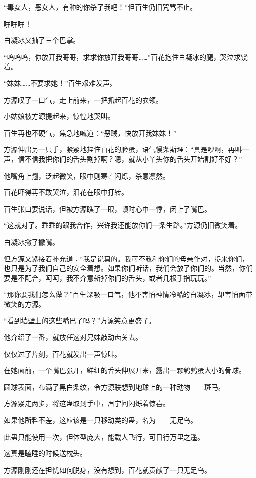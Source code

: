 \begin{this_body}
“毒女人，恶女人，有种的你杀了我吧！”但百生仍旧咒骂不止。

啪啪啪！

白凝冰又抽了三个巴掌。

“呜呜呜，你放开我哥哥，求求你放开我哥哥……”百花抱住白凝冰的腿，哭泣求饶着。

“妹妹……不要求她！”百生艰难发声。

方源叹了一口气，走上前来，一把抓起百花的衣领。

小姑娘被方源提起来，惊惶地哭叫。

百生再也不硬气，焦急地喊道：“恶贼，快放开我妹妹！”

方源伸出另一只手，紧紧地捏住百花的脸蛋，语气慢条斯理：“真是吵啊，再叫一声，信不信我把你们的舌头割掉啊？嗯，就从小丫头你的舌头开始割好不好？”

他嘴角上翘，泛起微笑，眼中则寒芒闪烁，杀意凛然。

百花吓得再不敢哭泣，泪花在眼中打转。

百生张口要说话，但被方源瞧了一眼，顿时心中一悸，闭上了嘴巴。

“这就对了。乖乖的跟我合作，兴许我还能放你们一条生路。”方源仍旧微笑着。

白凝冰撇了撇嘴。

但方源又紧接着补充道：“我是说真的。我可不敢和你们的母亲作对，捉来你们，也只是为了我们自己的安全着想。如果你们听话，我们会放了你们的。当然，你们要是不配合，呵呵，我不介意斩掉你们的舌头，或者几根手指玩玩。”

“那你要我们怎么做？”百生深吸一口气，他不害怕神情冷酷的白凝冰，却害怕面带微笑的方源。

“看到墙壁上的这些嘴巴了吗？”方源笑意更盛了。

他介绍了一番，就放任这对兄妹敲动齿关去。

仅仅过了片刻，百花就发出一声惊叫。

在她面前，一个嘴巴张开，鲜红的舌头伸展开来，露出一颗鹌鹑蛋大小的骨球。

圆球表面，布满了黑白条纹，令方源联想到地球上的一种动物——斑马。

方源紧走两步，将这蛊取到手中，眉宇间闪烁着惊喜。

如果他所料不差，这应该是一只移动类的蛊，名为——无足鸟。

此蛊只能使用一次，但体型庞大，能载人飞行，可日行万里之遥。

这真是瞌睡的时候送枕头。

方源刚刚还在担忧如何脱身，没有想到，百花就贡献了一只无足鸟。


\end{this_body}
